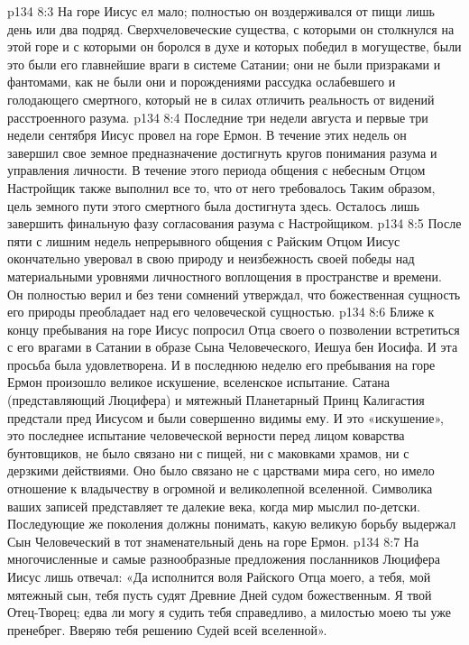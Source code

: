 \vs p134 8:3 \pc На горе Иисус ел мало; полностью он воздерживался от пищи лишь день или два подряд. Сверхчеловеческие существа, с которыми он столкнулся на этой горе и с которыми он боролся в духе и которых победил в могуществе, были  это были его главнейшие враги в системе Сатании; они не были призраками и фантомами, как не были они и порождениями рассудка ослабевшего и голодающего смертного, который не в силах отличить реальность от видений расстроенного разума.
\vs p134 8:4 Последние три недели августа и первые три недели сентября Иисус провел на горе Ермон. В течение этих недель он завершил свое земное предназначение достигнуть кругов понимания разума и управления личности. В течение этого периода общения с небесным Отцом Настройщик также выполнил все то, что от него требовалось Таким образом, цель земного пути этого смертного была достигнута здесь. Осталось лишь завершить финальную фазу согласования разума с Настройщиком.
\vs p134 8:5 После пяти с лишним недель непрерывного общения с Райским Отцом Иисус окончательно уверовал в свою природу и неизбежность своей победы над материальными уровнями личностного воплощения в пространстве и времени. Он полностью верил и без тени сомнений утверждал, что божественная сущность его природы преобладает над его человеческой сущностью.
\vs p134 8:6 \pc Ближе к концу пребывания на горе Иисус попросил Отца своего о позволении встретиться с его врагами в Сатании в образе Сына Человеческого, Иешуа бен Иосифа. И эта просьба была удовлетворена. И в последнюю неделю его пребывания на горе Ермон произошло великое искушение, вселенское испытание. Сатана (представляющий Люцифера) и мятежный Планетарный Принц Калигастия предстали пред Иисусом и были совершенно видимы ему. И это «искушение», это последнее испытание человеческой верности перед лицом коварства бунтовщиков, не было связано ни с пищей, ни с маковками храмов, ни с дерзкими действиями. Оно было связано не с царствами мира сего, но имело отношение к владычеству в огромной и великолепной вселенной. Символика ваших записей представляет те далекие века, когда мир мыслил по\hyp{}детски. Последующие же поколения должны понимать, какую великую борьбу выдержал Сын Человеческий в тот знаменательный день на горе Ермон.
\vs p134 8:7 На многочисленные и самые разнообразные предложения посланников Люцифера Иисус лишь отвечал: «Да исполнится воля Райского Отца моего, а тебя, мой мятежный сын, тебя пусть судят Древние Дней судом божественным. Я твой Отец\hyp{}Творец; едва ли могу я судить тебя справедливо, а милостью моею ты уже пренебрег. Вверяю тебя решению Судей всей вселенной».
